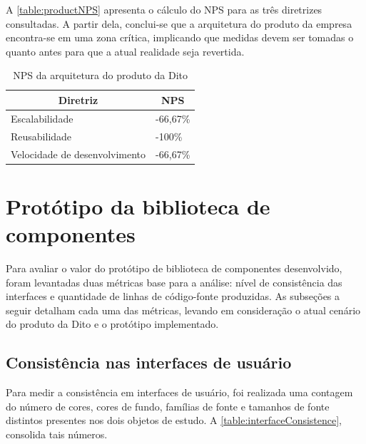 A \autoref{table:productNPS} apresenta o cálculo do NPS para as três diretrizes consultadas. A partir dela, conclui-se que a arquitetura do produto da empresa encontra-se em uma zona crítica, implicando que medidas devem ser tomadas o quanto antes para que a atual realidade seja revertida.

\begin{table}
  \centering
  \begin{tabular}{|m{6cm}|m{2cm}|} \hline
    
    \multicolumn{1}{|c|}{\bfseries Diretriz} & \multicolumn{1}{c|}{\bfseries NPS} \\\hline
    
    Escalabilidade & -66,67\% \\\hline
    Reusabilidade & -100\% \\\hline
    Velocidade de desenvolvimento & -66,67\% \\\hline
      
  \end{tabular}
  \caption{NPS da arquitetura do produto da Dito}
  \label{table:productNPS}
\end{table}


\section{Protótipo da biblioteca de componentes}

Para avaliar o valor do protótipo de biblioteca de componentes desenvolvido, foram levantadas duas métricas base para a análise: nível de consistência das interfaces e quantidade de linhas de código-fonte produzidas. As subseções a seguir detalham cada uma das métricas, levando em consideração o atual cenário do produto da Dito e o protótipo implementado.

\subsection{Consistência nas interfaces de usuário}

Para medir a consistência em interfaces de usuário, foi realizada uma contagem do número de cores, cores de fundo, famílias de fonte e tamanhos de fonte distintos presentes nos dois objetos de estudo. A \autoref{table:interfaceConsistence}, consolida tais números.

